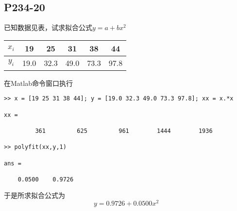 \subsection{P234-20}
已知数据见表，试求拟合公式$y=a + b x^2$
\begin{center}
\begin{tabular}{c|c c c c c}
$x_i$ & 19   & 25   & 31   & 38   & 44 \\
\hline
$y_i$ & 19.0 & 32.3 & 49.0 & 73.3 & 97.8
\end{tabular}
\end{center}
\begin{SOLVE}
在Matlab命令窗口执行
\begin{lstlisting}
>> x = [19 25 31 38 44]; y = [19.0 32.3 49.0 73.3 97.8]; xx = x.*x

xx =

         361         625         961        1444        1936

>> polyfit(xx,y,1)

ans =

    0.0500    0.9726
\end{lstlisting}
于是所求拟合公式为
\begin{displaymath}
y = 0.9726 + 0.0500 x^2
\end{displaymath}
\end{SOLVE}
